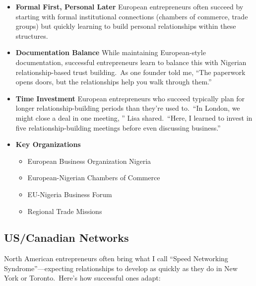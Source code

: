 \begin{itemize}
    \item \textbf{Formal First, Personal Later}
    European entrepreneurs often succeed by starting with formal institutional connections (chambers of commerce, trade groups) but quickly learning to build personal relationships within these structures.

    \item \textbf{Documentation Balance}
    While maintaining European-style documentation, successful entrepreneurs learn to balance this with Nigerian relationship-based trust building.\ As one founder told me, ``The paperwork opens doors, but the relationships help you walk through them.''

    \item \textbf{Time Investment}
    European entrepreneurs who succeed typically plan for longer relationship-building periods than they're used to.\ ``In London, we might close a deal in one meeting, '' Lisa shared.\ ``Here, I learned to invest in five relationship-building meetings before even discussing business.''

    \item \textbf{Key Organizations}
    \begin{itemize}
        \item European Business Organization Nigeria
        \item European-Nigerian Chambers of Commerce
        \item EU-Nigeria Business Forum
        \item Regional Trade Missions
    \end{itemize}
\end{itemize}

\subsection{US/Canadian Networks}\label{subsec:north-american-networks}

North American entrepreneurs often bring what I call ``Speed Networking Syndrome''—expecting relationships to develop as quickly as they do in New York or Toronto.\ Here's how successful ones adapt:

